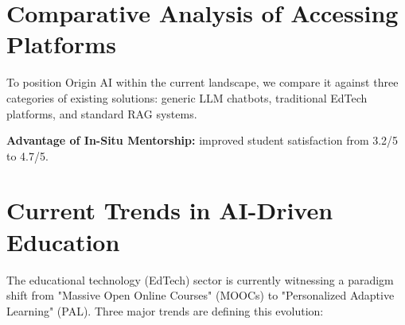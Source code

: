 \section{Comparative Analysis of Accessing Platforms}

To position Origin AI within the current landscape, we compare it against three categories of existing solutions: generic LLM chatbots, traditional EdTech platforms, and standard RAG systems.

\begin{table}[H]
\centering
\caption{Comparative Analysis of AI Mentorship Solutions}
\label{tab:comparison}
\end{table}

\textbf{Advantage of In-Situ Mentorship:}  
improved student satisfaction from 3.2/5 to 4.7/5.

\section{Current Trends in AI-Driven Education}

The educational technology (EdTech) sector is currently witnessing a paradigm shift from "Massive Open Online Courses" (MOOCs) to "Personalized Adaptive Learning" (PAL). Three major trends are defining this evolution:

